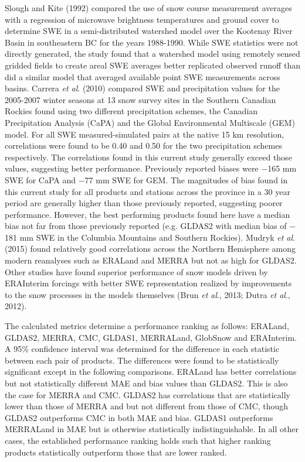 \documentclass[12pt]{article}
\begin{document}
Slough and Kite (1992) compared the use of snow course measurement averages with a regression of microwave brightness temperatures and ground cover to determine SWE in a semi-distributed watershed model over the Kootenay River Basin in southeastern BC for the years 1988-1990.  While SWE statistics were not directly generated, the study found that a watershed model using remotely sensed gridded fields to create areal SWE averages better replicated observed runoff than did a similar model that averaged available point SWE measurements across basins.
Carrera \textit{et al}. (2010) compared SWE and precipitation values for the 2005-2007 winter seasons at 13 snow survey sites in the Southern Canadian Rockies found using two different precipitation schemes, the Canadian Precipitation Analysis (CaPA) and the Global Environmental Multiscale (GEM) model.  For all SWE measured-simulated pairs at the native 15 km resolution, correlations were found to be 0.40 and 0.50 for the two precipitation schemes respectively.  The correlations found in this current study generally exceed those values, suggesting better performance.  Previously reported biases were $-$165 mm SWE for CaPA and $-$77 mm SWE for GEM.  
The magnitudes of bias found in this current study for all products and stations across the province in a 30 year period are generally higher than those previously reported, suggesting poorer performance.  However, the best performing products found here have a median bias not far from those previously reported (e.g. GLDAS2 with median bias of $-$181 mm SWE in the Columbia Mountains and Southern Rockies).  
Mudryk \textit{et al}. (2015) found relatively good correlations across the Northern Hemisphere among modern reanalyses such as ERALand and MERRA but not as high for GLDAS2.  
Other studies have found superior performance of snow models driven by ERAInterim forcings with better SWE representation realized by improvements to the snow processes in the models themselves (Brun \textit{et al}., 2013; Dutra \textit{et al}., 2012).

The calculated metrics determine a performance ranking as follows:  ERALand, GLDAS2, MERRA, CMC, GLDAS1, MERRALand, GlobSnow and ERAInterim.  
A 95\% confidence interval was determined for the difference in each statistic between each pair of products.  The differences were found to be statistically significant except in the following comparisons.  ERALand has better correlations but not statistically different MAE and bias values than GLDAS2.  This is also the case for MERRA and CMC.  GLDAS2 has correlations that are statistically lower than those of MERRA and but not different from those of CMC, though GLDAS2 outperforms CMC in both MAE and bias.  GLDAS1 outperforms MERRALand in MAE but is otherwise statistically indistinguishable.  In all other cases, the established performance ranking holds such that higher ranking products statistically outperform those that are lower ranked.  
\end{document}
